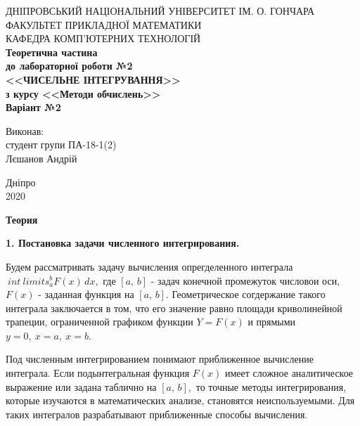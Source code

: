 \documentclass[14pt,a4paper,titlepage]{extarticle}
\begin{document}
      \begin{titlepage}
         \begin{center}
ДНІПРОВСЬКИЙ НАЦІОНАЛЬНИЙ УНІВЕРСИТЕТ ІМ. О. ГОНЧАРА\\
ФАКУЛЬТЕТ ПРИКЛАДНОЇ МАТЕМАТИКИ\\
КАФЕДРА КОМП'ЮТЕРНИХ ТЕХНОЛОГІЙ\\
            \vspace{6cm}
            \bf Теоретична частина\\
            \bf до лабораторної роботи №2\\
            \bf <<ЧИСЕЛЬНЕ ІНТЕГРУВАННЯ>>\\
            \bf з курсу <<Методи обчислень>>\\
            \bf Варіант №2
        \end{center}
        \vspace{3cm}
        \begin{flushright}
Виконав:\\
студент групи ПА-18-1(2)\\
Лєшанов Андрій
        \end{flushright}
        \begin{center}
        \vspace{4.5cm}
        Дніпро\\
         2020
        \end{center}
   \end{titlepage}
\setcounter{page}{2}
\newpage
{\centering\bf\large Теория\par}

{\bf 1. Постановка задачи численного интегрирования.}

Будем рассматривать задачу вычисления опрегделенного интеграла $ \ int \ limits_a ^ b F (x) \, dx, $ где $ [a, \, b] $ - задач конечной промежуток числовои оси, $ F (x) $ - заданная функция на $ [a, \, b]. $ Геометрическое согдержание такого интеграла заключается в том, что его значение равно площади криволинейной трапеции, ограниченной графиком функции
$ Y = F (x) $ и прямыми $ y = 0, \ x = a, \ x = b. $

Под численным интегрированием понимают приближенное вычисление интеграла. Если подынтегральная функция $ F (x) $ имеет сложное аналитическое выражение или задана таблично на $ [a, \, b], $ то точные методы интегрирования, которые изучаются в математических анализе, становятся неиспользуемыми. Для таких интегралов разрабатывают приближенные способы вычисления.
\end{document}
